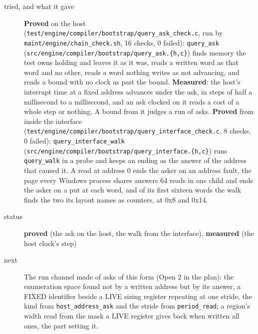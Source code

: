 \begin{description}
\item[{tried, and what it gave}] \textbf{Proved} on the host (\texttt{test/\allowbreak{}engine/\allowbreak{}compiler/\allowbreak{}bootstrap/\allowbreak{}query\_\allowbreak{}ask\_\allowbreak{}check.\allowbreak{}c}, run by \texttt{maint/\allowbreak{}engine/\allowbreak{}chain\_\allowbreak{}check.\allowbreak{}sh}, 16 checks, 0 failed): \texttt{query\_\allowbreak{}ask} (\texttt{src/\allowbreak{}engine/\allowbreak{}compiler/\allowbreak{}bootstrap/\allowbreak{}query\_\allowbreak{}ask.\allowbreak{}\{h,c\}}) finds memory the test owns holding and leaves it as it was, reads a written word as that word and no other, reads a word nothing writes as not advancing, and reads a bound with no clock as past the bound. \textbf{Measured}: the host's interrupt time at a fixed address advances under the ask, in steps of half a millisecond to a millisecond, and an ask clocked on it reads a cost of a whole step or nothing. A bound from it judges a run of asks. \textbf{Proved} from inside the interface (\texttt{test/\allowbreak{}engine/\allowbreak{}compiler/\allowbreak{}bootstrap/\allowbreak{}query\_\allowbreak{}interface\_\allowbreak{}check.\allowbreak{}c}, 8 checks, 0 failed): \texttt{query\_\allowbreak{}interface\_\allowbreak{}walk} (\texttt{src/\allowbreak{}engine/\allowbreak{}compiler/\allowbreak{}bootstrap/\allowbreak{}query\_\allowbreak{}interface.\allowbreak{}\{h,c\}}) runs \texttt{query\_\allowbreak{}walk} in a probe and keeps an ending as the answer of the address that caused it. A read at address 0 ends the asker on an address fault, the page every Windows process shares answers 64 reads in one child and ends the asker on a put at each word, and of its first sixteen words the walk finds the two its layout names as counters, at 0x8 and 0x14.
\item[{status}] \textbf{proved} (the ask on the host, the walk from the interface), \textbf{measured} (the host clock's step)
\item[{next}] The run channel made of asks of this form (Open 2 in the plan): the enumeration space found not by a written address but by its answer, a FIXED identifier beside a LIVE sizing register repeating at one stride, the kind from \texttt{host\_\allowbreak{}address\_\allowbreak{}ask} and the stride from \texttt{period\_\allowbreak{}read}; a region's width read from the mask a LIVE register gives back when written all ones, the part setting it.
\end{description}

